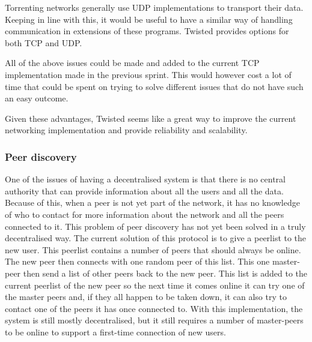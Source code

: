 Torrenting networks generally use UDP implementations to transport their data.
Keeping in line with this, it would be useful to have a similar way of handling communication in extensions of these programs.
Twisted provides options for both TCP and UDP.


All of the above issues could be made and added to the current TCP implementation made in the previous sprint.
This would however cost a lot of time that could be spent on trying to solve different issues that do not have such an easy outcome.

Given these advantages, Twisted seems like a great way to improve the current networking implementation and provide reliability and scalability.

\subsubsection{Peer discovery}
\label{sprint2:peerdiscovery}
One of the issues of having a decentralised system is that there is no central authority that can provide information about all the users and all the data. 
Because of this, when a peer is not yet part of the network, it has no knowledge of who to contact for more information about the network and all the peers connected to it. 
This problem of peer discovery has not yet been solved in a truly decentralised way. 
The current solution of this protocol is to give a peerlist to the new user.
This peerlist contains a number of peers that should always be online. 
The new peer then connects with one random peer of this list. 
This one master-peer then send a list of other peers back to the new peer.
This list is added to the current peerlist of the new peer so the next time it comes online it can try one of the master peers and, if they all happen to be taken down, it can also try to contact one of the peers it has once connected to.
With this implementation, the system is still mostly decentralised, but it still requires a number of master-peers to be online to support a first-time connection of new users.


